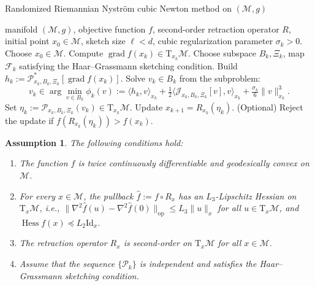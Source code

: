 \documentclass[10pt,a4paper]{amsart}
\newtheorem{assumption}{Assumption}
\newcommand{\Hess}{\operatorname{Hess}}
\DeclareMathOperator{\grad}{grad}
\begin{document}
\begin{algorithm}[H]
  \caption{Randomized Riemannian Nystr\"om cubic Newton method on $(\mathcal{M},g)$}
  \label{alg:sscn-riem}
  \begin{algorithmic}[1]
  \Require manifold $(\mathcal{M},g)$, objective function $f$, second-order retraction operator $R$, initial point $x_0\in\mathcal{M}$, sketch size $\ell < d$, cubic regularization parameter $\sigma_k>0$.
  \State Choose $x_0\in\mathcal{M}$.
  \State Compute $\grad f(x_k)\in \mathrm{T}_{x_k}\mathcal{M}$.
  \State Choose subspace $B_k, \Xi_k$, map $\mathcal{F}_k$ satisfying the Haar--Grassmann sketching condition.
  \State Build $h_k:=\mathcal{P}_{x_k, B_k, \Xi_k}^* [\grad f(x_k)]$.
  \State Solve $v_k \in B_k$ from the subproblem:\[
  v_k \in \arg\min_{v\in B_k} \phi_k(v) := \langle h_k, v\rangle_{x_k} + \tfrac{1}{2}\langle \mathcal{J}_{x_k, B_k, \Xi_k} [v], v\rangle_{x_k} + \tfrac{\sigma_k}{6}\|v\|_{x_k}^{3}.
  \]
  \State Set $\eta_k:=\mathcal{P}_{x_k, B_k, \Xi_k}(v_k) \in \mathrm{T}_{x_k}\mathcal M$.
  \State Update $x_{k+1}=R_{x_k}(\eta_k)$.
  \State (Optional) Reject the update if $f(R_{x_k}(\eta_k)) > f(x_k)$.
  \EndFor
  \end{algorithmic}
  \end{algorithm}

\begin{assumption}
\label{ass:smooth}
The following conditions hold:
\begin{enumerate}
\item[1.] The function $f$ is twice continuously differentiable and geodesically convex on $\mathcal{M}$.

\item[2.] For every $x\in\mathcal{M}$, the pullback $\hat f:=f\circ R_x$ has an $L_3$-Lipschitz Hessian on $\mathrm{T}_x\mathcal{M}$, i.e., $\|\nabla^{2}\hat f(u)-\nabla^{2}\hat f(0)\|_{\mathrm{op}}\le L_3\|u\|_x$ for all $u\in\mathrm{T}_x\mathcal{M}$, and $\Hess f(x) \preceq L_2 \mathrm{Id}_x$.

\item[3.] The retraction operator $R_x$ is second-order on $\mathrm{T}_x\mathcal{M}$ for all $x\in\mathcal{M}$. 

\item[4.] Assume that the sequence $\{\mathcal{P}_k\}$ is independent and satisfies the Haar--Grassmann sketching condition.
\end{enumerate}
\end{assumption} 
\end{document}
